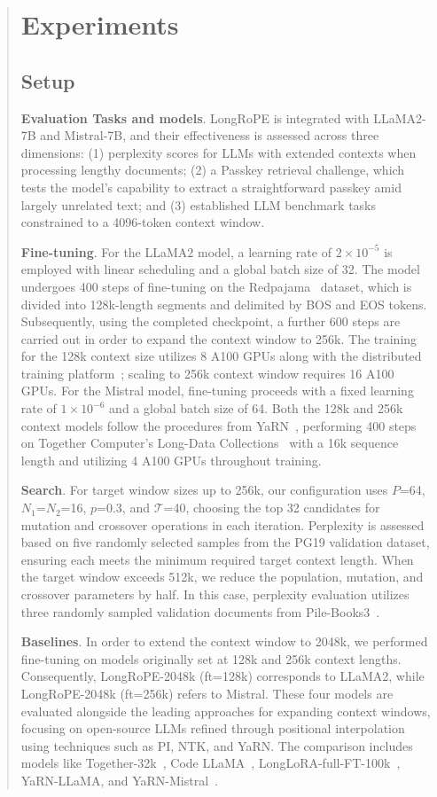 \begin{abstract}
 \section{Experiments}

\subsection{Setup}
\textbf{Evaluation Tasks and models}. LongRoPE is integrated with LLaMA2-7B and Mistral-7B, and their effectiveness is assessed across three dimensions: (1) perplexity scores for LLMs with extended contexts when processing lengthy documents; (2) a Passkey retrieval challenge, which tests the model’s capability to extract a straightforward passkey amid largely unrelated text; and (3) established LLM benchmark tasks constrained to a 4096-token context window.

\textbf{Fine-tuning}. For the LLaMA2 model, a learning rate of $2 \times 10^{-5}$ is employed with linear scheduling and a global batch size of 32. The model undergoes 400 steps of fine-tuning on the Redpajama~\cite{redpajama} dataset, which is divided into 128k-length segments and delimited by BOS and EOS tokens. Subsequently, using the completed checkpoint, a further 600 steps are carried out in order to expand the context window to 256k. The training for the 128k context size utilizes 8 A100 GPUs along with the distributed training platform~\cite{cube}; scaling to 256k context window requires 16 A100 GPUs. For the Mistral model, fine-tuning proceeds with a fixed learning rate of $1 \times 10^{-6}$ and a global batch size of 64. Both the 128k and 256k context models follow the procedures from YaRN~\cite{yarn}, performing 400 steps on Together Computer’s Long-Data Collections~\cite{mistraldata} with a 16k sequence length and utilizing 4 A100 GPUs throughout training.

\textbf{Search}. For target window sizes up to 256k, our configuration uses $P$=64, $N_1$=$N_2$=16, $p$=0.3, and $\mathcal{T}$=40, choosing the top 32 candidates for mutation and crossover operations in each iteration. Perplexity is assessed based on five randomly selected samples from the PG19 validation dataset, ensuring each meets the minimum required target context length. When the target window exceeds 512k, we reduce the population, mutation, and crossover parameters by half. In this case, perplexity evaluation utilizes three randomly sampled validation documents from Pile-Books3~\cite{pile}.

\textbf{Baselines}. In order to extend the context window to 2048k, we performed fine-tuning on models originally set at 128k and 256k context lengths. Consequently, LongRoPE-2048k (ft=128k) corresponds to LLaMA2, while LongRoPE-2048k (ft=256k) refers to Mistral. These four models are evaluated alongside the leading approaches for expanding context windows, focusing on open-source LLMs refined through positional interpolation using techniques such as PI, NTK, and YaRN. The comparison includes models like Together-32k~\cite{together}, Code LLaMA~\cite{codellama}, LongLoRA-full-FT-100k~\cite{longlora}, YaRN-LLaMA, and YaRN-Mistral~\cite{yarn}.


\end{abstract}
